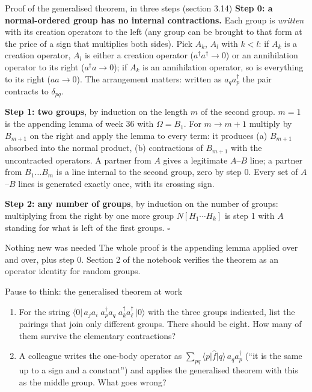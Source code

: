 \documentclass[aspectratio=169,10pt]{beamer}
\newcounter{thinkctr}
\newcommand{\thinkq}[2]{%
  \stepcounter{thinkctr}%
  \begin{tcolorbox}[colback=palewarm,colframe=warm,title={\bfseries Pause to think \#\thethinkctr\hfill\mdseries\small(about #1 min -- discuss with your neighbour)},fonttitle=\bfseries]
  #2
  \end{tcolorbox}}
\newcommand{\ket}[1]{\vert #1\rangle}
\newcommand{\bra}[1]{\langle #1\vert}
\newcommand{\element}[3]{\langle #1\vert #2\vert #3\rangle}
\begin{document}
\begin{frame}{Proof of the generalised theorem, in three steps (section 3.14)}
  \small
  \textbf{Step 0: a normal-ordered group has no internal contractions.} Each group is \emph{written} with its creation operators to the left (any group can be brought to that form at the price of a sign that multiplies both sides). Pick $A_k$, $A_l$ with $k<l$: if $A_k$ is a creation operator, $A_l$ is either a creation operator ($a^{\dagger}a^{\dagger}\to0$) or an annihilation operator to its right ($a^{\dagger}a\to0$); if $A_k$ is an annihilation operator, so is everything to its right ($aa\to0$). \alert{The arrangement matters}: written as $a_qa_p^{\dagger}$ the pair contracts to $\delta_{pq}$.
  \vspace{0.3em}

  \textbf{Step 1: two groups}, by induction on the length $m$ of the second group. $m=1$ is the appending lemma of week 36 with $\Omega=B_1$. For $m\to m+1$ multiply by $B_{m+1}$ on the right and apply the lemma to every term: it produces (a) $B_{m+1}$ absorbed into the normal product, (b) contractions of $B_{m+1}$ with the uncontracted operators. A partner from $A$ gives a legitimate $A$--$B$ line; a partner from $B_1\dots B_m$ is a line internal to the second group, \alert{zero by step 0}. Every set of $A$--$B$ lines is generated exactly once, with its crossing sign.
  \vspace{0.3em}

  \textbf{Step 2: any number of groups}, by induction on the number of groups: multiplying from the right by one more group $N[H_1\cdots H_k]$ is step 1 with $A$ standing for what is left of the first groups. $\square$
  \begin{exampleblock}{Nothing new was needed}
    The whole proof is the appending lemma applied over and over, plus step 0. Section 2 of the notebook verifies the theorem as an operator identity for random groups.
  \end{exampleblock}
\end{frame}

\begin{frame}{Pause to think: the generalised theorem at work}
  \thinkq{4}{
  \begin{enumerate}
    \item For the string $\bra{0}\,a_ja_i\;a_p^{\dagger}a_q\;a_k^{\dagger}a_\ell^{\dagger}\,\ket{0}$ with the three groups indicated, list the pairings that join only different groups. There should be eight. How many of them survive the elementary contractions?
    \item A colleague writes the one-body operator as $\sum_{pq}\element{p}{\hat{f}}{q}\,a_qa_p^{\dagger}$ (``it is the same up to a sign and a constant'') and applies the generalised theorem with this as the middle group. What goes wrong?
  \end{enumerate}}
\end{frame}
\end{document}
